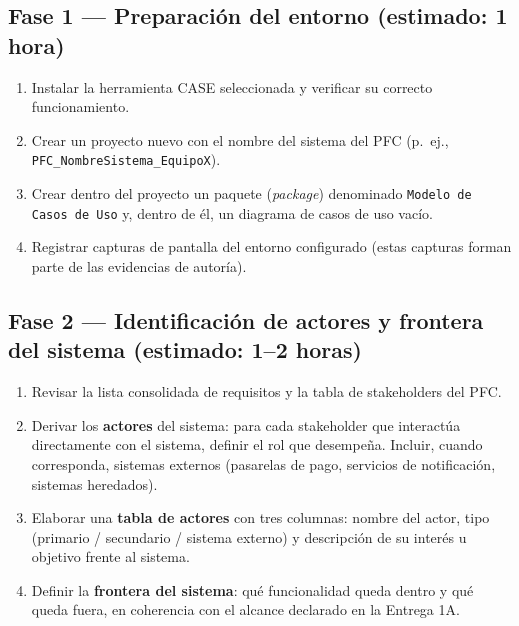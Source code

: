 \documentclass[11pt]{article}
\begin{document}
\subsection*{\textcolor{midblue}{Fase 1 --- Preparación del entorno (estimado: 1 hora)}}
\begin{enumerate}[leftmargin=18pt,itemsep=2pt]
  \item Instalar la herramienta CASE seleccionada y verificar su correcto funcionamiento.
  \item Crear un proyecto nuevo con el nombre del sistema del PFC (p.~ej., \texttt{PFC\_NombreSistema\_EquipoX}).
  \item Crear dentro del proyecto un paquete (\textit{package}) denominado \texttt{Modelo de Casos de Uso} y, dentro de él, un diagrama de casos de uso vacío.
  \item Registrar capturas de pantalla del entorno configurado (estas capturas forman parte de las evidencias de autoría).
\end{enumerate}

\subsection*{\textcolor{midblue}{Fase 2 --- Identificación de actores y frontera del sistema (estimado: 1--2 horas)}}
\begin{enumerate}[leftmargin=18pt,itemsep=2pt]
  \item Revisar la lista consolidada de requisitos y la tabla de stakeholders del PFC.
  \item Derivar los \textbf{actores} del sistema: para cada stakeholder que interactúa directamente con el sistema, definir el rol que desempeña. Incluir, cuando corresponda, sistemas externos (pasarelas de pago, servicios de notificación, sistemas heredados).
  \item Elaborar una \textbf{tabla de actores} con tres columnas: nombre del actor, tipo (primario / secundario / sistema externo) y descripción de su interés u objetivo frente al sistema.
  \item Definir la \textbf{frontera del sistema}: qué funcionalidad queda dentro y qué queda fuera, en coherencia con el alcance declarado en la Entrega 1A.
\end{enumerate}
\end{document}
